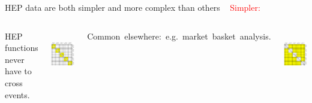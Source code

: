 \documentclass[aspectratio=169]{beamer}
\begin{document}
\begin{frame}{HEP data are both simpler and more complex than others}
\vspace{0.35 cm}
\mbox{ } \hfill \textcolor{red}{\LARGE Simpler:} \hfill \mbox{ }

\vspace{0.25 cm}
\begin{columns}

HEP functions never have to cross events.

\vspace{0.25 cm}
\mbox{ } \hfill \includegraphics[width=0.8\linewidth]{event-variable-correlation-hep.pdf} \hfill \mbox{ }


\mbox{\hspace{-0.5 cm}Common elsewhere: e.g.\ market basket analysis.\hspace{-0.5 cm}}

\vspace{0.25 cm}
\mbox{ } \hfill \includegraphics[width=0.8\linewidth]{event-variable-correlation-marketbasket-2.pdf} \hfill \mbox{ }

\end{columns}
\end{frame}
\end{document}
